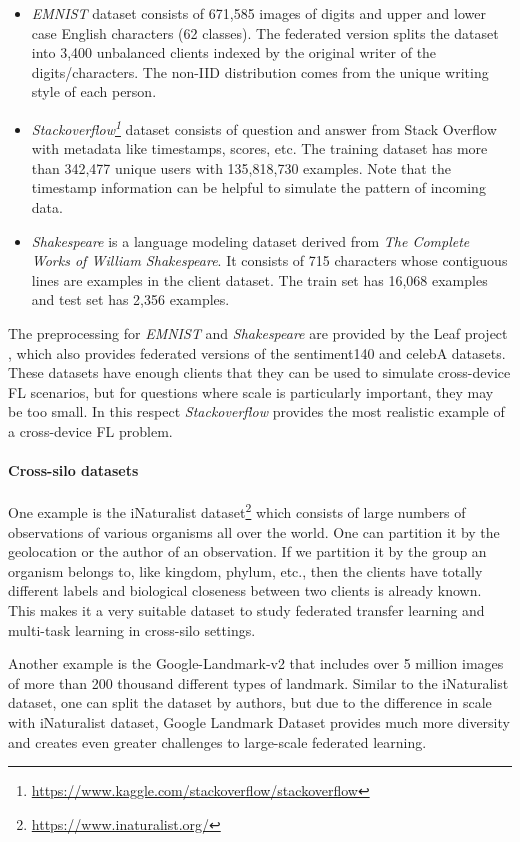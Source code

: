 \documentclass[11pt]{article}
\begin{document}
\begin{itemize}
    \item \textit{EMNIST} dataset \cite{cohen2017emnist} consists of 671,585 images of digits and upper and lower case English characters (62 classes).
    The federated version splits the dataset into 3,400 unbalanced clients indexed by the original writer of the digits/characters.
    The non-IID distribution comes from the unique writing style of each person.
    \item \textit{Stackoverflow\footnote{\url{https://www.kaggle.com/stackoverflow/stackoverflow}}} dataset consists of question and answer from Stack Overflow with metadata like timestamps, scores, etc.
    The training dataset has more than 342,477 unique users with 135,818,730 examples.
    Note that the timestamp information can be helpful to simulate the pattern of incoming data.
    \item \textit{Shakespeare} is a language modeling dataset derived from \textit{The Complete Works of William Shakespeare}. 
    It consists of 715 characters whose contiguous lines are examples in the client dataset. The train set has 16,068 examples and test set has 2,356 examples.
\end{itemize}
The preprocessing for \textit{EMNIST} and \textit{Shakespeare} are provided by the Leaf project \cite{caldas2018leaf}, which also provides federated versions of the sentiment140 and celebA datasets. These datasets have enough clients that they can be used to simulate cross-device FL scenarios, but for questions where scale is particularly important, they may be too small. In this respect \textit{Stackoverflow} provides the most realistic example of a cross-device FL problem.

\paragraph{Cross-silo datasets}
One example is the iNaturalist dataset\footnote{\url{https://www.inaturalist.org/}} which consists of large numbers of observations of various organisms all over the world. One can partition it by the geolocation or the author of an observation. If we partition it by the group an organism belongs to, like kingdom, phylum, etc., then the clients have totally different labels and biological closeness between two clients is already known. This makes it a very suitable dataset to study federated transfer learning and multi-task learning in cross-silo settings. 

Another example is the Google-Landmark-v2 \citep{GDLv2} that includes over 5 million images of more than 200 thousand different types of landmark. Similar to the iNaturalist dataset, one can split the dataset by authors, but due to the difference in scale with iNaturalist dataset, Google Landmark Dataset provides much more diversity and creates even greater challenges to large-scale federated learning.
\end{document}
